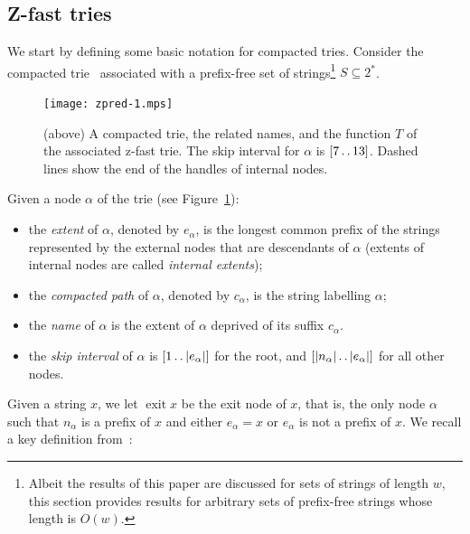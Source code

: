 \documentclass[a4paper,11pt]{article}
\newcommand{\?}{\mskip1.5mu}
\def\..{\,\mathpunct{\ldotp\ldotp}} %
\DeclareMathOperator{\exit}{exit}
\begin{document}
\subsection{Z-fast tries} 

We start by defining some basic notation for compacted tries. Consider the compacted
trie~\cite{Knuth98} associated with a prefix-free set of strings\footnote{Albeit
the results of this paper are discussed for sets of strings
of length $w$, this section provides results for arbitrary sets of prefix-free strings whose length is
$O(w)$.} $S\subseteq 2^*$. \begin{figure}[t]
\centering
\texttt{[image: zpred-1.mps]}\qquad{}
\caption{\label{fig:ztrie}(above) A compacted trie, the related names, and the
function $T$ of the associated z-fast trie. The skip interval for $\alpha$ is
$[7\..13]$. Dashed lines show the end of the handles of internal nodes.}
\end{figure}
Given a node $\alpha$ of the trie (see Figure~\ref{fig:ztrie}):
\begin{itemize}
	\item the \emph{extent} of $\alpha$, denoted by $e_\alpha$, is the longest
	common prefix of the strings represented by the external nodes 
	that are descendants of $\alpha$ (extents of internal nodes are called
	\emph{internal extents});
	\item the \emph{compacted path} of $\alpha$, denoted by $c_\alpha$, is the
	string labelling $\alpha$;
 	\item the \emph{name} of $\alpha$ is the extent of $\alpha$
 	deprived of its suffix $c_\alpha$.
	\item the \emph{skip interval} of $\alpha$ is $[1\..|e_\alpha|]$ for the root, and $[|n_\alpha|\..|e_\alpha|]$
	for all other nodes.
\end{itemize}

Given a string $x$, we let $\exit x$ be the exit node of $x$, that is, the
only node $\alpha$ such that $n_\alpha$ is a prefix of $x$ and
either $e_\alpha=x$ or $e_\alpha$ is not a prefix of $x$.
We recall a key definition from~\cite{BelazzouguiBoPaVi09}:
\end{document}
